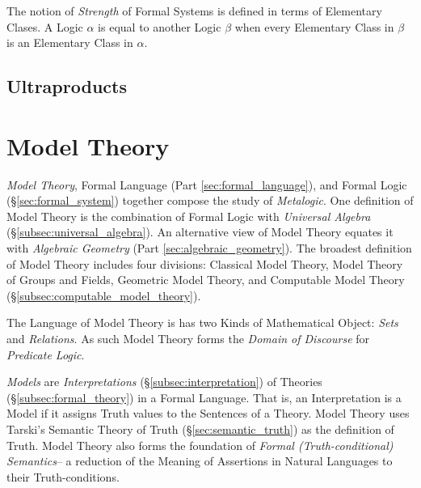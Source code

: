 The notion of \emph{Strength} of Formal Systems is defined in terms of
Elementary Clases. A Logic $\alpha$ is equal to another Logic $\beta$
when every Elementary Class in $\beta$ is an Elementary Class in
$\alpha$.

\subsection{Ultraproducts}\label{subsec:ultraproducts}



\section{Model Theory}\label{sec:model_theory}

\emph{Model Theory}, Formal Language (Part \ref{sec:formal_language}),
and Formal Logic (\S\ref{sec:formal_system}) together compose the
study of \emph{Metalogic}. One definition of Model Theory is the
combination of Formal Logic with \emph{Universal Algebra}
(\S\ref{subsec:universal_algebra}). An alternative view of Model
Theory equates it with \emph{Algebraic Geometry}
(Part \ref{sec:algebraic_geometry}). The broadest definition of Model
Theory includes four divisions: Classical Model Theory, Model Theory
of Groups and Fields, Geometric Model Theory, and Computable Model
Theory (\S\ref{subsec:computable_model_theory}).

The Language of Model Theory is has two Kinds of Mathematical Object:
\emph{Sets} and \emph{Relations}. As such Model Theory forms the
\emph{Domain of Discourse} for \emph{Predicate Logic}. %

\emph{Models} are \emph{Interpretations}
(\S\ref{subsec:interpretation}) of Theories
(\S\ref{subsec:formal_theory}) in a Formal Language. That is, an
Interpretation is a Model if it assigns Truth values to the Sentences
of a Theory. Model Theory uses Tarski's Semantic Theory of Truth
(\S\ref{sec:semantic_truth}) as the definition of Truth. Model Theory
also forms the foundation of \emph{Formal (Truth-conditional)
  Semantics}-- a reduction of the Meaning of Assertions in Natural
Languages to their Truth-conditions.

